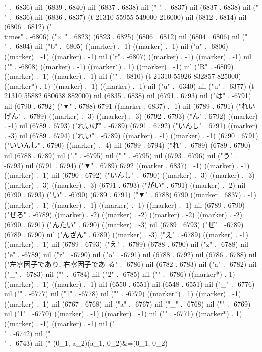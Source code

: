 " . -6836) nil (6839 . 6840) nil (6837 . 6838) nil (" " . -6837) nil (6837 . 6838) nil (" " . -6836) nil (6836 . 6837) (t 21310 55955 549000 216000) nil (6812 . 6814) nil (6806 . 6812) ("\\times" . -6806) ("×
" . 6823) (6823 . 6825) (6806 . 6812) nil (6804 . 6806) nil ("\\" . -6804) nil ("b" . -6805) ((marker) . -1) ((marker) . -1) nil ("a" . -6806) ((marker) . -1) ((marker) . -1) nil ("r" . -6807) ((marker) . -1) ((marker) . -1) nil ("{" . -6808) ((marker) . -1) ((marker*) . 1) ((marker) . -1) nil ("R" . -6809) ((marker) . -1) ((marker) . -1) nil ("}" . -6810) (t 21310 55926 832857 825000) ((marker*) . 1) ((marker) . -1) ((marker) . -1) nil ("u" . -6340) nil ("u" . -6377) (t 21310 55882 680638 882000) nil (6835 . 6838) nil (6791 . 6793) nil ("は" . -6791) nil (6790 . 6792) ("▼" . 6788) 6791 ((marker . 6837) . -1) nil (6789 . 6791) ("れいげん" . -6789) ((marker) . -3) ((marker) . -3) (6792 . 6793) ("ん" . 6792) ((marker) . -1) nil (6789 . 6793) ("れいげ" . -6789) (6791 . 6792) ("いんし" . 6791) ((marker) . -3) nil (6789 . 6794) ("れい" . -6789) ((marker) . -1) ((marker) . -1) (6790 . 6791) ("いいんし" . 6790) ((marker) . -4) nil (6789 . 6794) ("れ" . -6789) (6789 . 6790) nil (6788 . 6789) nil ("." . -6795) nil (" " . -6795) nil (6793 . 6796) nil ("う" . -6793) nil (6791 . 6794) ("▼" . 6789) 6792 ((marker . 6837) . -1) ((marker) . -1) ((marker) . -1) nil (6790 . 6792) ("いんし" . -6790) ((marker) . -3) ((marker) . -3) ((marker) . -3) ((marker) . -3) (6791 . 6793) ("がい" . 6791) ((marker) . -2) nil (6790 . 6793) ("い" . -6790) (6789 . 6791) ("▼" . 6788) 6790 ((marker . 6837) . -1) ((marker) . -1) ((marker) . -1) ((marker) . -1) ((marker) . -1) nil (6789 . 6790) ("ぜろ" . -6789) ((marker) . -2) ((marker) . -2) ((marker) . -2) ((marker) . -2) (6790 . 6791) ("んたい" . 6790) ((marker) . -3) nil (6789 . 6793) ("ぜ" . -6789) (6789 . 6790) nil ("んざん" . 6789) ((marker) . -3) ("え" . -6789) ((marker) . -1) ((marker) . -1) nil (6789 . 6793) ("え" . -6789) (6788 . 6790) nil ("z" . -6788) nil ("e" . -6789) nil ("r" . -6790) nil ("o" . -6791) nil (6788 . 6792) nil (6786 . 6788) nil ("左零因子であり, 右零因子であ
 る" . -6786) nil (6782 . 6783) nil ("a" . -6782) nil ("_" . -6783) nil ("{" . -6784) nil ("2" . -6785) nil ("}" . -6786) ((marker*) . 1) ((marker) . -1) ((marker) . -1) nil (6550 . 6551) nil (6548 . 6551) nil ("_" . -6776) nil ("{" . -6777) nil ("1" . -6778) nil ("}" . -6779) ((marker*) . 1) ((marker) . -1) ((marker) . -1) nil (6767 . 6768) nil ("a" . -6767) nil ("_" . -6768) nil ("{" . -6769) nil ("1" . -6770) ((marker) . -1) ((marker) . -1) nil ("}" . -6771) ((marker*) . 1) ((marker) . -1) ((marker) . -1) nil ("\\" . -6742) nil ("\\" . -6743) nil ("  (0_{1}, a_{2})(a_{1}, 0_{2})&=(0_{1}, 0_{2})
